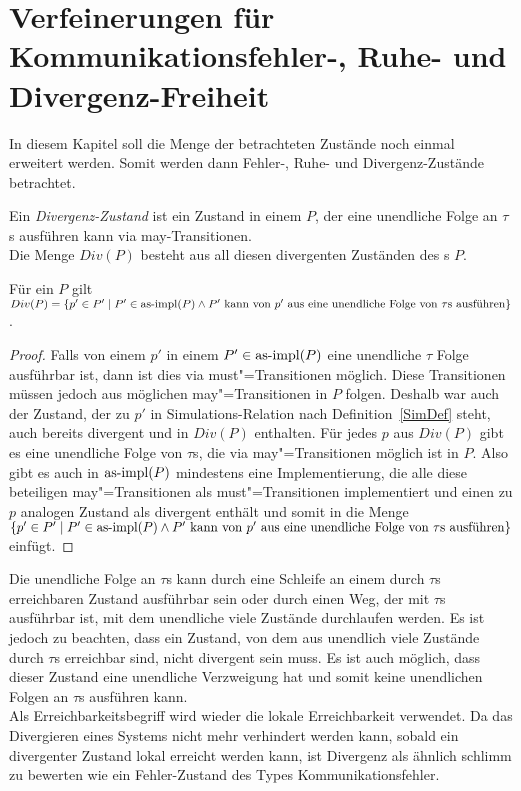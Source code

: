 \chapter{Verfeinerungen für Kommunikationsfehler-, Ruhe- und Divergenz-Freiheit}

In diesem Kapitel soll die Menge der betrachteten Zustände noch einmal
erweitert werden. Somit werden dann Fehler-, Ruhe- und Divergenz-Zustände
betrachtet.

\begin{Def}[Divergenz]
  Ein \emph{Divergenz-Zustand} ist ein Zustand in einem \MEIO{} $P$, der eine
  unendliche Folge an $\tau$s ausführen kann via may-Transitionen.\\
  Die Menge $Div(P)$ besteht aus all diesen divergenten Zuständen des \MEIO{}s
  $P$.
\end{Def}

\begin{Prop}
  \label{DivProp}
  Für ein \MEIO{} $P$ gilt $Div (P) = \left\{p'\in P'\mid P'\in\mathrm{as}\text{-}\mathrm{impl} (P)
  \land P' \text{ kann von } p' \text{ aus eine unendliche Folge von } \tau
  \text{s ausführen} \right\}$.
\end{Prop}
\begin{proof}
  Falls von einem $p'$ in einem $P'\in\mathrm{as}\text{-}\mathrm{impl} (P)$ eine unendliche $\tau$ Folge
  ausführbar ist, dann ist dies via must"=Transitionen möglich. Diese
  Transitionen müssen jedoch aus möglichen may"=Transitionen in $P$ folgen.
  Deshalb war auch der Zustand, der zu $p'$ in Simulations-Relation nach
  Definition~\ref{SimDef} steht, auch bereits divergent und in $Div (P)$
  enthalten. Für jedes $p$ aus $Div (P)$ gibt es eine unendliche Folge von
  $\tau$s, die via may"=Transitionen möglich ist in $P$. Also gibt es auch in
  $\mathrm{as}\text{-}\mathrm{impl} (P)$ mindestens eine Implementierung, die alle diese beteiligen
  may"=Transitionen als must"=Transitionen implementiert und einen zu $p$
  analogen Zustand als divergent enthält und somit in die Menge $\left\{p'\in
  P'\mid P'\in\mathrm{as}\text{-}\mathrm{impl} (P) \land P' \text{ kann von } p' \text{ aus eine
  unendliche Folge von } \tau \text{s ausführen} \right\}$ einfügt.
\end{proof}

Die unendliche Folge an $\tau$s kann durch eine Schleife an einem durch $\tau$s
erreichbaren Zustand ausführbar sein oder durch einen Weg, der mit $\tau$s
ausführbar ist, mit dem unendliche viele Zustände durchlaufen werden. Es ist
jedoch zu beachten, dass ein Zustand, von dem aus unendlich viele Zustände
durch $\tau$s  erreichbar sind, nicht divergent sein muss. Es ist auch möglich,
dass dieser Zustand eine unendliche Verzweigung hat und somit keine unendlichen
Folgen an $\tau$s ausführen kann.\\
Als Erreichbarkeitsbegriff wird wieder die lokale Erreichbarkeit verwendet. Da
das Divergieren eines Systems nicht mehr verhindert werden kann, sobald ein
divergenter Zustand lokal erreicht werden kann, ist Divergenz als ähnlich \glqq
schlimm\grqq{} zu bewerten wie ein Fehler-Zustand des Types
Kommunikationsfehler.

